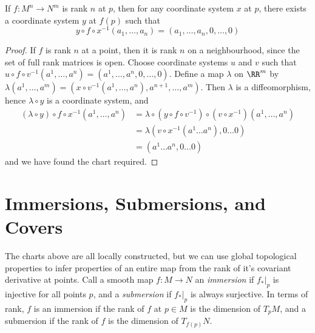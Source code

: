 \begin{corollary}
    If $f: M^n \to N^m$ is rank $n$ at $p$, then for any coordinate system $x$ at $p$, there exists a coordinate system $y$ at $f(p)$ such that
    \[ y \circ f \circ x^{-1} (a_1, \dots, a_n) = (a_1, \dots, a_n, 0, \dots, 0) \]
\end{corollary}
\begin{proof}
    If $f$ is rank $n$ at a point, then it is rank $n$ on a neighbourhood, since the set of full rank matrices is open. Choose coordinate systems $u$ and $v$ such that $u \circ f \circ v^{-1}(a^1, \dots, a^n) = (a^1, \dots, a^n, 0, \dots, 0)$. Define a map $\lambda$ on $\RR^m$ by $\lambda(a^1, \dots, a^m) = (x \circ v^{-1}(a^1, \dots, a^n), a^{n+1}, \dots, a^m)$. Then $\lambda$ is a diffeomorphism, hence $\lambda \circ y$ is a coordinate system, and
    \begin{align*}
        (\lambda \circ y) \circ f \circ x^{-1} (a^1, \dots, a^n) &= \lambda \circ (y \circ f \circ v^{-1}) \circ (v \circ x^{-1}) (a^1, \dots, a^n)\\
        &= \lambda (v \circ x^{-1} (a^1 \dots a^n), 0 \dots 0)\\
        &= (a^1 \dots a^n, 0 \dots 0)
    \end{align*}
    and we have found the chart required.
\end{proof}

\section{Immersions, Submersions, and Covers}

The charts above are all locally constructed, but we can use global topological properties to infer properties of an entire map from the rank of it's covariant derivative at points. Call a smooth map $f:M \to N$ an \emph{immersion} if $f_*|_p$ is injective for all points $p$, and a \emph{submersion} if $f_*|_p$ is always surjective. In terms of rank, $f$ is an immersion if the rank of $f$ at $p \in M$ is the dimension of $T_pM$, and a submersion if the rank of $f$ is the dimension of $T_{f(p)}N$.

